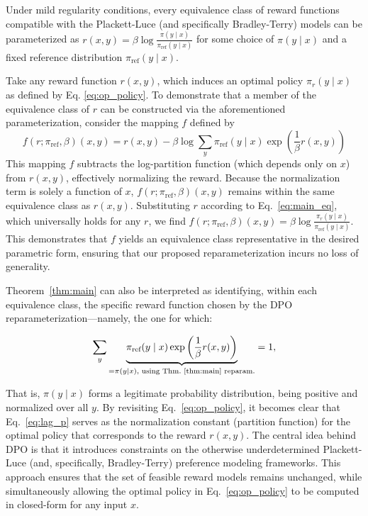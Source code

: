 \begin{theorem}\label{thm:main}
    Under mild regularity conditions, every equivalence class of reward functions compatible with the Plackett-Luce (and specifically Bradley-Terry) models can be parameterized as ${r(x, y) = \beta \log \frac{\pi(y\mid x)}{\pi_\text{ref}(y\mid x)}}$ for some choice of $\pi(y\mid x)$ and a fixed reference distribution $\pi_\text{ref}(y \mid x)$.
\end{theorem}

\begin{sproof}
    Take any reward function $r(x, y)$, which induces an optimal policy $\pi_r(y \mid x)$ as defined by Eq. \ref{eq:op_policy}. To demonstrate that a member of the equivalence class of $r$ can be constructed via the aforementioned parameterization, consider the mapping $f$ defined by  
\begin{equation}
    f(r; \pi_\text{ref}, \beta)(x, y) = r(x, y) - \beta\log\sum_{y}\pi_\text{ref}(y\mid x)\exp\left(\frac{1}{\beta}r(x, y)\right)
\end{equation}
This mapping $f$ subtracts the log-partition function (which depends only on $x$) from $r(x, y)$, effectively normalizing the reward. Because the normalization term is solely a function of $x$, $f(r; \pi_\text{ref}, \beta)(x, y)$ remains within the same equivalence class as $r(x, y)$. Substituting $r$ according to Eq.~\ref{eq:main_eq}, which universally holds for any $r$, we find $f(r; \pi_\text{ref}, \beta)(x, y) = \beta \log \frac{\pi_r(y\mid x)}{\pi_\text{ref}(y\mid x)}$. This demonstrates that $f$ yields an equivalence class representative in the desired parametric form, ensuring that our proposed reparameterization incurs no loss of generality.
\end{sproof}

Theorem~\ref{thm:main} can also be interpreted as identifying, within each equivalence class, the specific reward function chosen by the DPO reparameterization—namely, the one for which:

\begin{equation}\label{eq:lag_p}
     \sum_{y}\underbrace{\pi_\text{ref}(y\mid x)\exp\left(\frac{1}{\beta}r(x, y)\right)}_{=\pi(y\mid x)\text{, using Thm.~\ref{thm:main} reparam.}} = 1,
\end{equation}

That is, $\pi(y\mid x)$ forms a legitimate probability distribution, being positive and normalized over all $y$. By revisiting Eq.~\ref{eq:op_policy}, it becomes clear that Eq.~\ref{eq:lag_p} serves as the normalization constant (partition function) for the optimal policy that corresponds to the reward $r(x, y)$. The central idea behind DPO is that it introduces constraints on the otherwise underdetermined Plackett-Luce (and, specifically, Bradley-Terry) preference modeling frameworks. This approach ensures that the set of feasible reward models remains unchanged, while simultaneously allowing the optimal policy in Eq.~\ref{eq:op_policy} to be computed in closed-form for any input $x$.

